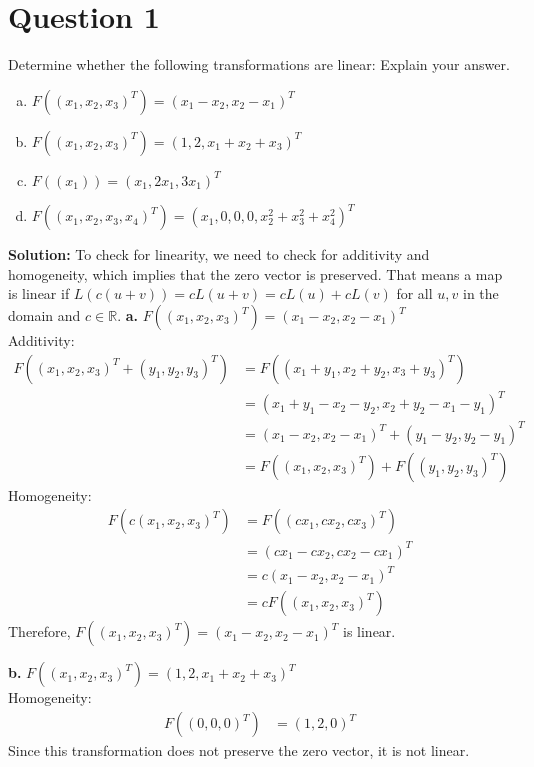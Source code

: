\documentclass{article}
\begin{document}
\section*{Question 1}
Determine whether the following transformations are linear: Explain your answer.
\begin{enumerate}[a.]
    \item $ F((x_1, x_2, x_3)^T) = (x_1 - x_2, x_2 - x_1)^T $
    \item $ F((x_1, x_2, x_3)^T) = (1, 2, x_1 + x_2 + x_3)^T $
    \item $ F((x_1)) = (x_1, 2x_1, 3x_1)^T $
    \item $ F((x_1, x_2, x_3, x_4)^T) = (x_1, 0, 0, 0, x_2^2 + x_3^2 + x_4^2)^T $
\end{enumerate}

\noindent\textbf{Solution:} To check for linearity, we need to check for additivity and homogeneity, which implies that the zero vector is preserved.
That means a map is linear if $L(c(u + v)) = cL(u + v) = cL(u) + cL(v)$ for all $u, v$ in the domain and $c \in \mathbb{R}$.
\vspace{0.25cm}
\newline\noindent\textbf{a.} $ F((x_1, x_2, x_3)^T) = (x_1 - x_2, x_2 - x_1)^T $ \\
Additivity:
\begin{align*}
    F((x_1, x_2, x_3)^T + (y_1, y_2, y_3)^T) &= F((x_1 + y_1, x_2 + y_2, x_3 + y_3)^T) \\
    &= (x_1 + y_1 - x_2 - y_2, x_2 + y_2 - x_1 - y_1)^T \\
    &= (x_1 - x_2, x_2 - x_1)^T + (y_1 - y_2, y_2 - y_1)^T \\
    &= F((x_1, x_2, x_3)^T) + F((y_1, y_2, y_3)^T)
\end{align*}
Homogeneity:
\begin{align*}
    F(c(x_1, x_2, x_3)^T) &= F((cx_1, cx_2, cx_3)^T) \\
    &= (cx_1 - cx_2, cx_2 - cx_1)^T \\
    &= c(x_1 - x_2, x_2 - x_1)^T \\
    &= cF((x_1, x_2, x_3)^T)
\end{align*}
Therefore, $F((x_1, x_2, x_3)^T) = (x_1 - x_2, x_2 - x_1)^T$ is linear.

\vspace{0.25cm}
\noindent\textbf{b.} $ F((x_1, x_2, x_3)^T) = (1, 2, x_1 + x_2 + x_3)^T $ \\
Homogeneity:
\begin{align*}
    F((0, 0, 0)^T) &= (1, 2, 0)^T
\end{align*}
Since this transformation does not preserve the zero vector, it is not linear.
\end{document}

